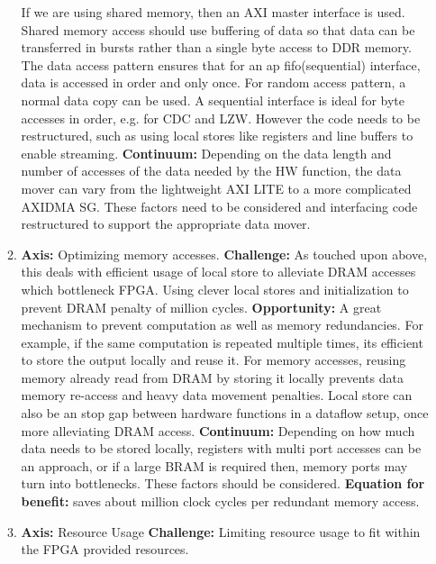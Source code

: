 \documentclass{article}
\begin{document}
\begin{enumerate}
\begin{enumerate}
If we are using shared memory, then an AXI master interface is used. Shared memory access should use buffering of data so that data can be transferred in bursts rather than a single byte access to DDR memory.
The data access pattern ensures that for an ap fifo(sequential) interface, data is accessed in order and only once. For random access pattern, a normal data copy can be used. 
A sequential interface is ideal for byte accesses in order, e.g. for CDC and LZW. However the code needs to be restructured, such as using local stores like registers and line buffers to enable streaming. 
\newline
\textbf{Continuum:} Depending on the data length and number of accesses of the data needed by the HW function, the data mover can vary from the lightweight AXI LITE to a more complicated AXIDMA SG. These factors need to be considered and interfacing code restructured to support the appropriate data mover.
\newline
\item%
\textbf{Axis:} Optimizing memory accesses. 
\newline
\textbf{Challenge: } As touched upon above, this deals with efficient usage of local store to alleviate DRAM accesses which bottleneck FPGA. Using clever local stores and initialization to prevent DRAM penalty of million cycles.
\newline
\textbf{Opportunity: } A great mechanism to prevent computation as well as memory redundancies. For example, if the same computation is repeated multiple times, its efficient to store the output locally and reuse it. 
For memory accesses, reusing memory already read from DRAM by storing it locally prevents data memory re-access and heavy data movement penalties. 
Local store can also be an stop gap between hardware functions in a dataflow setup, once more alleviating DRAM access.
\newline
\textbf{Continuum: } Depending on how much data needs to be stored locally, registers with multi port accesses can be an approach, or if a large BRAM is required then, memory ports may turn into bottlenecks. These factors should be considered. 
\newline
\textbf{Equation for benefit: } saves about million clock cycles per redundant memory access.
\item%
\textbf{Axis:} Resource Usage
\newline
\textbf{Challenge: }  Limiting resource usage to fit within the FPGA provided resources.
\newline

\end{enumerate}
\end{enumerate}
\end{document}
